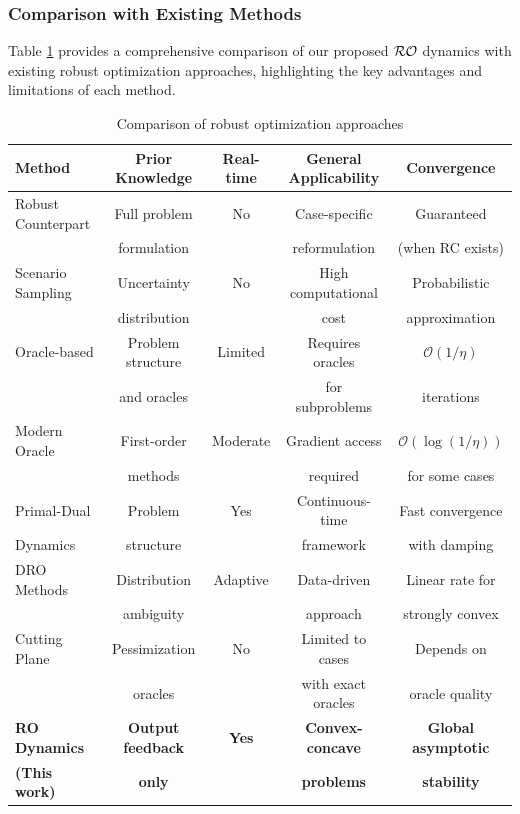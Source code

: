 \documentclass[journal,twoside,web]{ieeecolor}
\begin{document}
{\color{blue} \subsubsection{Comparison with Existing Methods}
Table \ref{tab:comparison} provides a comprehensive comparison of our proposed ${\cal RO}$ dynamics with existing robust optimization approaches, highlighting the key advantages and limitations of each method.

\begin{table}[h]
\centering
\caption{Comparison of robust optimization approaches}
\label{tab:comparison}
\begin{tabular}{|l|c|c|c|c|}
\hline
\textbf{Method} & \textbf{Prior Knowledge} & \textbf{Real-time} & \textbf{General Applicability} & \textbf{Convergence} \\
\hline
Robust Counterpart & Full problem & No & Case-specific & Guaranteed \\
\cite{bental2009} & formulation & & reformulation & (when RC exists) \\
\hline
Scenario Sampling & Uncertainty & No & High computational & Probabilistic \\
\cite{calafiore2004} & distribution & & cost & approximation \\
\hline
Oracle-based & Problem structure & Limited & Requires oracles & $\mathcal{O}(1/\eta)$ \\
\cite{bental2015} & and oracles & & for subproblems & iterations \\
\hline
{\color{blue} Modern Oracle} & {\color{blue} First-order} & {\color{blue} Moderate} & {\color{blue} Gradient access} & {\color{blue} $\mathcal{O}(\log(1/\eta))$} \\
{\color{blue} \cite{he2022,chen2022}} & {\color{blue} methods} & & {\color{blue} required} & {\color{blue} for some cases} \\
\hline
{\color{blue} Primal-Dual} & {\color{blue} Problem} & {\color{blue} Yes} & {\color{blue} Continuous-time} & {\color{blue} Fast convergence} \\
{\color{blue} Dynamics \cite{timerescaling2023}} & {\color{blue} structure} & & {\color{blue} framework} & {\color{blue} with damping} \\
\hline
{\color{blue} DRO Methods} & {\color{blue} Distribution} & {\color{blue} Adaptive} & {\color{blue} Data-driven} & {\color{blue} Linear rate for} \\
{\color{blue} \cite{aigner2023,drago2024}} & {\color{blue} ambiguity} & & {\color{blue} approach} & {\color{blue} strongly convex} \\
\hline
Cutting Plane & Pessimization & No & Limited to cases & Depends on \\
\cite{mutapcic2009} & oracles & & with exact oracles & oracle quality \\
\hline
\textbf{RO Dynamics} & \textbf{Output feedback} & \textbf{Yes} & \textbf{Convex-concave} & \textbf{Global asymptotic} \\
\textbf{(This work)} & \textbf{only} & & \textbf{problems} & \textbf{stability} \\
\hline
\end{tabular}
\end{table}}
\end{document}
